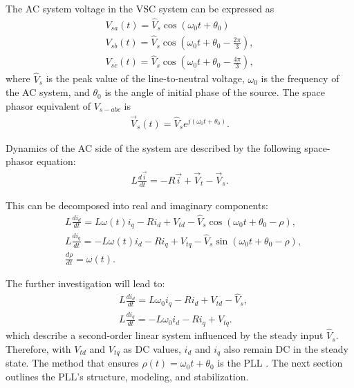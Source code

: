 The AC system voltage in the VSC system can be expressed as
\begin{equation}
    \begin{array}{l}
        V_{s a}(t)=\widehat{V}_{s} \cos \left(\omega_{0} t+\theta_{0}\right) \\
        V_{s b}(t)=\widehat{V}_{s} \cos \left(\omega_{0} t+\theta_{0}-\frac{2 \pi}{3}\right), \\
        V_{s c}(t)=\widehat{V}_{s} \cos \left(\omega_{0} t+\theta_{0}-\frac{4 \pi}{3}\right),
    \end{array}
\end{equation}
where $\widehat{V}_s$ is the peak value of the line-to-neutral voltage, $\omega_0$ is the frequency of the AC system, and $\theta_0$ is the angle of initial phase of the source. The space phasor equivalent of $V_{s-a b c}$ is
\begin{equation}
    \begin{aligned}
        \label{eq:v_phasor}
        \vec{V}_s(t)=\widehat{V}_s e^{j\left(\omega_0 t+\theta_0\right)}.
    \end{aligned}
\end{equation}

Dynamics of the AC side of the system are described by the following space-phasor equation:
\begin{equation}
    \label{eq:inv_dynamic}
    \begin{aligned}
        L \frac{d \vec{i}}{d t}=-R \vec{i}+\vec{V}_t-\vec{V}_s.
    \end{aligned}
\end{equation}

This can be decomposed into real and imaginary components:
\begin{equation}
    \label{eq:inv_nonlinear}
    \begin{aligned}
        & L \frac{d i_d}{d t}=L \omega(t) i_q-R i_d+V_{t d}-\widehat{V}_s \cos \left(\omega_0 t+\theta_0-\rho\right), \\
        & L \frac{d i_q}{d t}=-L \omega(t) i_d-R i_q+V_{t q}-\widehat{V}_s \sin \left(\omega_0 t+\theta_0-\rho\right), \\
        & \frac{d \rho}{d t}=\omega(t).
    \end{aligned}
\end{equation}

The further investigation will lead to:
\begin{equation}
    \begin{aligned}
        & L \frac{d i_d}{d t}=L \omega_0 i_q-R i_d+V_{t d}-\widehat{V}_s, \\
        & L \frac{d i_q}{d t}=-L \omega_0 i_d-R i_q+V_{t q}.
    \end{aligned}
\end{equation}
which describe a second-order linear system influenced by the steady input $\widehat{V}_s$. Therefore, with $V_{t d}$ and $V_{t q}$ as DC values, $i_d$ and $i_q$ also remain DC in the steady state. The method that ensures $\rho(t)=\omega_0 t+\theta_0$ is the PLL \autocite{book_yazdani_2010}. The next section outlines the PLL's structure, modeling, and stabilization.

